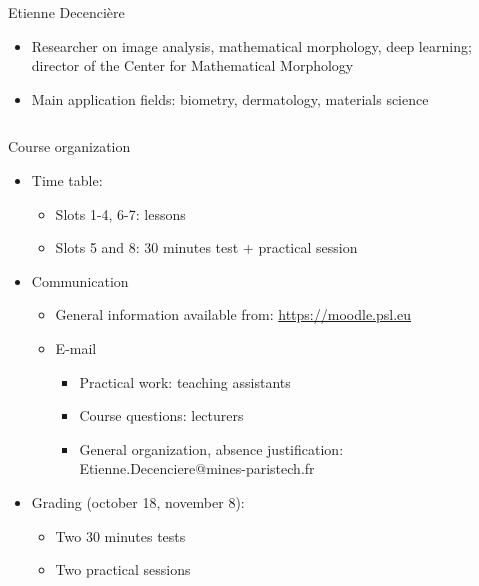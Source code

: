 \documentclass[xcolor=pdftex,dvipsnames,table,mathserif]{beamer}
\begin{document}
{\begin{columns}
\begin{column}{.8\textwidth}
    \begin{block}{Etienne Decencière}
      \scriptsize{
    \begin{itemize}
    \item Researcher on image analysis, mathematical morphology, deep learning; director of the Center for Mathematical Morphology
    \item Main application fields: biometry, dermatology, materials science
    \end{itemize}
    }
  \end{block}

  \end{column}
\end{columns}

}

\begin{frame}{Course organization}

  \begin{itemize}

  \item Time table:
    \begin{itemize}
    \item Slots 1-4, 6-7: lessons
    \item Slots 5 and 8: 30 minutes test + practical session
    \end{itemize}
  \item Communication
    \begin{itemize}
    \item General information available from: \url{https://moodle.psl.eu}
    \item E-mail
      \begin{itemize}
      \item Practical work: teaching assistants
      \item Course questions: lecturers
      \item General organization, absence justification: Etienne.Decenciere@mines-paristech.fr
      \end{itemize}
    \end{itemize}
  \item Grading (october 18, november 8):
    \begin{itemize}
    \item Two 30 minutes tests
    \item Two practical sessions
    \end{itemize}

  \end{itemize}
\end{frame}
\end{document}
